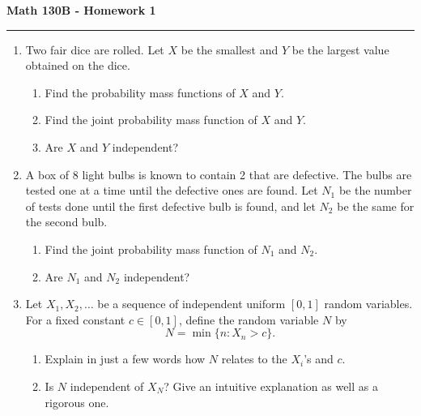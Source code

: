 \documentclass[11pt,letterpaper]{article}
\begin{document}
\begin{center}
{\bf \Large Math 130B - Homework 1}
\vspace{0.2cm}
\hrule
\end{center}



\begin{enumerate}

    \item Two fair dice are rolled.
    Let $X$ be the smallest and $Y$ be the largest value obtained on the dice.
    \begin{enumerate}
        \item Find the probability mass functions of $X$ and $Y$.

        \item Find the joint probability mass function of $X$ and $Y$.

        \item Are $X$ and $Y$ independent?
    \end{enumerate}

    \item A box of 8 light bulbs is known to contain 2 that are defective.
    The bulbs are tested one at a time until the defective ones are found.
    Let $N_1$ be the number of tests done until the first defective bulb is found, and let $N_2$ be the same for the second bulb.
    \begin{enumerate}
        \item Find the joint probability mass function of $N_1$ and $N_2$.

        \item Are $N_1$ and $N_2$ independent?
    \end{enumerate}

    \item Let $X_1, X_2, \ldots$ be a sequence of independent uniform $[0,1]$ random variables.
    For a fixed constant $c\in [0,1]$, define the random variable $N$ by
    \[
        N = \min\{n: X_n > c\}.
    \]
    \begin{enumerate}
        \item Explain in just a few words how $N$ relates to the $X_i$'s and $c$.

        \item Is $N$ independent of $X_N$? Give an intuitive explanation as well as a rigorous one.
    \end{enumerate}



\end{enumerate}
\end{document}
